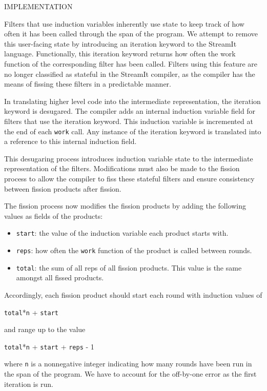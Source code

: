 {\large IMPLEMENTATION}

Filters that use induction variables inherently use state to keep track of
how often it has been called through the span of the program.  We attempt 
to remove this user-facing state by introducing an iteration keyword to the 
StreamIt language.  Functionally, this iteration keyword returns how often 
the work function of the corresponding filter has been called.  Filters 
using this feature are no longer classified as stateful in the StreamIt
compiler, as the compiler has the means of fissing these filters in a 
predictable manner.

In translating higher level code into the intermediate representation, the 
iteration keyword is desugared.  The compiler adds an internal induction 
variable field for filters that use the iteration keyword.  This induction
variable is incremented at the end of each \texttt{work} call.  Any instance
of the iteration keyword is translated into a reference to this internal 
induction field.  

This desugaring process introduces induction variable state to the intermediate
representation of the filters.  Modifications must also be made to the fission 
process to allow the compiler to fiss these stateful filters and ensure 
consistency between fission products after fission.  

The fission process now modifies the fission products by adding the 
following values as fields of the products:
\begin{itemize}
	\item \texttt{start}: the value of the induction variable each product starts with.
	\item \texttt{reps}: how often the \texttt{work} function of the product is 
	  called between rounds.
	\item \texttt{total}: the sum of all reps of all fission products. This value is 
	  the same amongst all fissed products.
\end{itemize}
Accordingly, each fission product should start each round with induction values
of
\begin{center}
\texttt{total}*\texttt{n} + \texttt{start}
\end{center}
and range up to the value
\begin{center}
\texttt{total}*\texttt{n} + \texttt{start} + \texttt{reps} - 1
\end{center}
where \texttt{n} is a nonnegative integer indicating how many rounds have
been run in the span of the program.  We have to account for the off-by-one
error as the first iteration is run.

